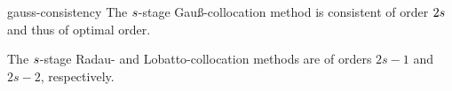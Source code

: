 \begin{Theorem}{gauss-consistency}
  The $s$-stage Gauß-collocation method is consistent of order
  $2s$ and thus of optimal order.
  
  The $s$-stage Radau- and Lobatto-collocation methods are of
  orders $2s-1$ and $2s-2$, respectively.
\end{Theorem}



